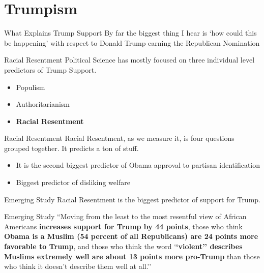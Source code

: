 \documentclass{beamer}
\begin{document}
\section{Trumpism}
\begin{frame}{What Explains Trump Support}
By far the biggest thing I hear is `how could this be happening' with respect to Donald Trump earning the Republican Nomination
\end{frame}
\begin{frame}{Racial Resentment}
Political Science has mostly focused on three individual level predictors of Trump Support.
\begin{itemize}
\item Populism
\item Authoritarianism
\item \textbf{Racial Resentment}
\end{itemize}
\end{frame}
\begin{frame}{Racial Resentment}
Racial Resentment, as we measure it, is four questions grouped together. It predicts a ton of stuff.
\begin{itemize}
\item It is the second biggest predictor of Obama approval to partisan identification
\item Biggest predictor of disliking welfare
\end{itemize}
\end{frame}
\begin{frame}{Emerging Study}
Racial Resentment is the biggest predictor of support for Trump.
\end{frame}
\begin{frame}{Emerging Study}
``Moving from the least to the most resentful view of African Americans \textbf{increases support for Trump by 44 points}, those who think \textbf{Obama is a Muslim (54 percent of all Republicans) are 24 points more favorable to Trump}, and those who think the word `\textbf{`violent'' describes Muslims extremely well are about 13 points more pro-Trump} than those who think it doesn’t describe them well at all.''

\end{frame}
\end{document}
